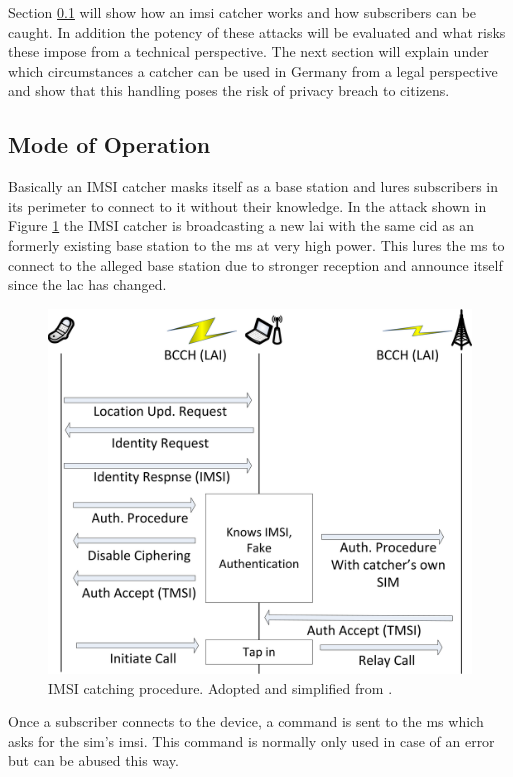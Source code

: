 Section \ref{sec:catcher_operation} will show how an \gls{imsi} catcher works and how subscribers can be caught.
In addition the potency of these attacks will be evaluated and what risks these impose from a technical perspective.
The next section will explain under which circumstances a catcher can be used in Germany from a legal perspective and show that this handling poses the risk of privacy breach to citizens.

\subsection{Mode of Operation}
\label{sec:catcher_operation}
Basically an IMSI catcher masks itself as a base station and lures subscribers in its perimeter to connect to it without their knowledge.
In the attack \cite{mueller} shown in Figure \ref{fig:catcher_catch} the IMSI catcher is broadcasting a new \gls{lai} with the same \gls{cid} as an formerly existing base station to the \gls{ms} at very high power.
This lures the \gls{ms} to connect to the alleged base station due to stronger reception and announce itself since the \gls{lac} has changed.

\begin{figure}
	\centering
	\includegraphics{../Images/catcher_attack}
	\caption{IMSI catching procedure. Adopted and simplified from \cite{mueller}.}
	\label{fig:catcher_catch}
\end{figure}

Once a subscriber connects to the device, a command is sent to the \gls{ms} which asks for the \gls{sim}'s \gls{imsi}.
This command is normally only used in case of an error \cite{fox} but can be abused this way.

